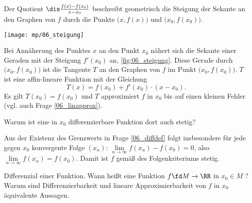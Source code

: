 \begin{antwort}
Der Quotient $\dis \frac{f(x)-f(x_0)}{x-x_0}$ beschreibt 
geometrisch die Steigung der 
Sekante an den Graphen von $f$ durch die 
Punkte $\big(x,f(x)\big)$ und $\big(x_0,f(x_0)\big)$. 

\begin{center}
  \texttt{[image: mp/06\_steigung]}
  \label{fig:06_steigung}
\end{center}

Bei Annäherung des Punktes $x$ an den Punkt $x_0$  nähert sich die 
Sekante einer Geraden mit der Steigung $f'(x_0)$ an, 
\sieheAbbildung\ref{fig:06_steigung}. Diese Gerade 
durch $\big( x_0, f(x_0) \big)$ ist die Tangente $T$ an den Graphen 
von $f$ im Punkt $\big( x_0, f(x_0) \big)$. $T$ ist eine affin-lineare 
Funktion mit der Gleichung 
\[
T( x ) = f(x_0) + f'(x_0) \cdot (x-x_0 ).
\]
Es gilt $T(x_0)=f(x_0)$ und $T$ approximiert $f$ in $x_0$ bis auf einen 
kleinen Fehler (vgl. auch Frage \ref{06_linapprox}).
\AntEnd
\end{antwort}


\begin{frage}
Warum ist eine in $x_0$ differenzierbare Funktion dort auch stetig?
\end{frage}

\begin{antwort}
Aus der Existenz des Grenzwerts in Frage \ref{06_diffdef} 
folgt insbesondere für jede gegen $x_0$ konvergente Folge $(x_n)$: 
$\lim\limits_{n\to\infty} f(x_n)-f(x_0)=0$, also 
$\lim\limits_{n\to\infty } f(x_n) = f(x_0)$. Damit ist $f$ gemäß 
des Folgenkriteriums stetig.
\AntEnd
\end{antwort} 


\begin{frage}\label{06_linapprox}
Differenzial einer Funktion.  
Wann heißt eine Funktion $f\fd M\to\RR$ in $x_0\in M$ 
? Warum sind Differenzierbarkeit 
und lineare Approximierbarkeit von $f$ in $x_0$ äquivalente Aussagen. 
\end{frage}

